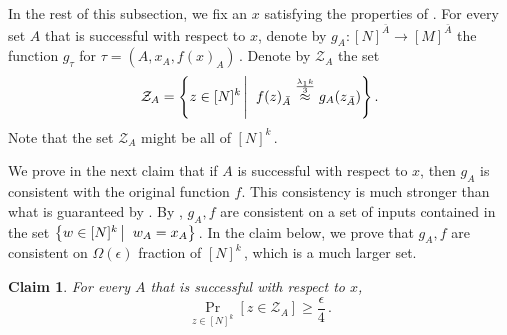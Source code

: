 \documentclass[11pt]{article}
\numberwithin{equation}{section}
\newtheorem{claim}[theorem]{Claim}
\theoremstyle{definition}
\theoremstyle{plain}
\newcommand{\Prob}[2][]{\Pr_{{#1}}\left[#2\right]} %
\newcommand\sett[2]{\left\{ #1 \left| \; \vphantom{#1 #2} \right. #2  \right\}} %
\newcommand\f{f} %
\newcommand{\g}{g} %
\newcommand\neql[1]{\stackrel{{#1}}{ \approx}} %
\newcommand\rest[1]{{\bar{#1}}}  %
\newcommand\zi{\mathcal{Z}} %
\begin{document}
In the rest of this subsection, we fix an $x$ satisfying the properties of .
For every set $A$ that is successful with respect to $x$, denote by $\g_A:[N]^{\rest{A}}\rightarrow[M]^{\rest{A}}$ the function $\g_\tau$ for $\tau = (A,x_A,\f(x)_A)$\,.
Denote by $\zi_A$ the set
\[\zi_A = \sett{z\in[N]^k}{\f(z)_{\rest{A}}\neql{\frac{\lambda_1 k}{3}}\g_A(z_{\rest{A}})}. \]
Note that the set $\zi_A$ might be all of $[N]^k$\,.

We prove in the next claim that if $A$ is successful with respect to $x$, then $\g_A$ is consistent with the original function $\f$. This consistency is much stronger than what is guaranteed by . By , $\g_A,\f$ are consistent on a set of inputs contained in the set $\sett{w\in [N]^k}{w_A=x_A}$\,. In the claim below, we prove that $\g_A,\f$ are consistent on $\Omega(\epsilon)$ fraction of $[N]^k$\,, which is a much larger set.
\begin{claim} \label{claim:z in zi_A}
	For every $A$ that is successful with respect to $x$, 
	\[\Prob[{z\in[N]^k}]{z\in\zi_A}\geq\frac{\epsilon}{4}\,.\] %
\end{claim}
\end{document}
